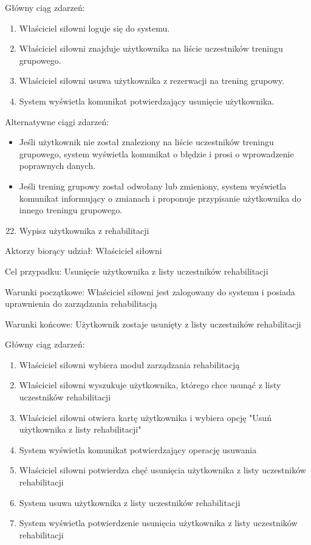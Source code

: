 \documentclass[
]{article}
\providecommand{\tightlist}{%
  \setlength{\itemsep}{0pt}\setlength{\parskip}{0pt}}
\begin{document}
{Główny ciąg zdarzeń:}

\begin{enumerate}
\tightlist
\item
  {Właściciel siłowni loguje się do systemu.}
\item
  {Właściciel siłowni znajduje użytkownika na liście uczestników
  treningu grupowego.}
\item
  {Właściciel siłowni usuwa użytkownika z rezerwacji na trening
  grupowy.}
\item
  {System wyświetla komunikat potwierdzający usunięcie użytkownika.}
\end{enumerate}

{Alternatywne ciągi zdarzeń:}

\begin{itemize}
\tightlist
\item
  {Jeśli użytkownik nie został znaleziony na liście uczestników treningu
  grupowego, system wyświetla komunikat o błędzie i prosi o wprowadzenie
  poprawnych danych.}
\item
  {Jeśli trening grupowy został odwołany lub zmieniony, system wyświetla
  komunikat informujący o zmianach i proponuje przypisanie użytkownika
  do innego treningu grupowego.}
\end{itemize}

{}

{}

{}

\begin{enumerate}
\setcounter{enumi}{21}
\tightlist
\item
  {Wypisz użytkownika z rehabilitacji}
\end{enumerate}

{Aktorzy biorący udział: Właściciel siłowni}

{Cel przypadku: Usunięcie użytkownika z listy uczestników rehabilitacji}

{Warunki początkowe: Właściciel siłowni jest zalogowany do systemu i
posiada uprawnienia do zarządzania rehabilitacją}

{Warunki końcowe: Użytkownik zostaje usunięty z listy uczestników
rehabilitacji}

{Główny ciąg zdarzeń:}

\begin{enumerate}
\tightlist
\item
  {Właściciel siłowni wybiera moduł zarządzania rehabilitacją}
\item
  {Właściciel siłowni wyszukuje użytkownika, którego chce usunąć z listy
  uczestników rehabilitacji}
\item
  {Właściciel siłowni otwiera kartę użytkownika i wybiera opcję "Usuń
  użytkownika z listy rehabilitacji"}
\item
  {System wyświetla komunikat potwierdzający operację usuwania}
\item
  {Właściciel siłowni potwierdza chęć usunięcia użytkownika z listy
  uczestników rehabilitacji}
\item
  {System usuwa użytkownika z listy uczestników rehabilitacji}
\item
  {System wyświetla potwierdzenie usunięcia użytkownika z listy
  uczestników rehabilitacji}
\end{enumerate}
\end{document}
